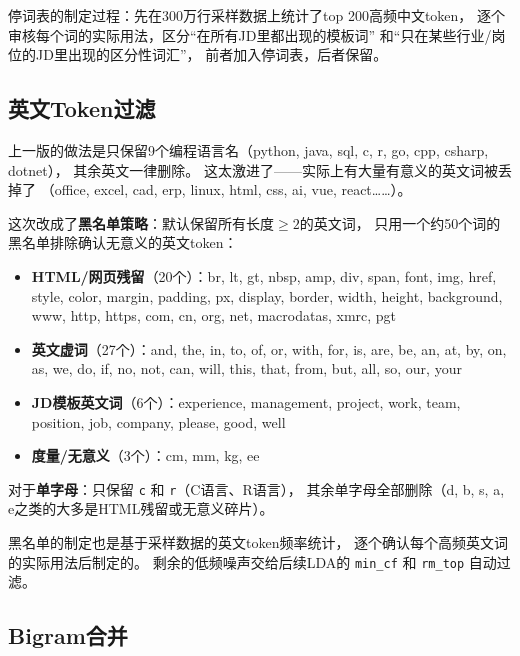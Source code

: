 \documentclass[12pt,a4paper]{ctexart}
\begin{document}
停词表的制定过程：先在300万行采样数据上统计了top 200高频中文token，
逐个审核每个词的实际用法，区分``在所有JD里都出现的模板词''
和``只在某些行业/岗位的JD里出现的区分性词汇''，
前者加入停词表，后者保留。


\subsection{英文Token过滤}

上一版的做法是只保留9个编程语言名（python, java, sql, c, r, go, cpp, csharp, dotnet），
其余英文一律删除。
这太激进了——实际上有大量有意义的英文词被丢掉了
（office, excel, cad, erp, linux, html, css, ai, vue, react……）。

这次改成了\textbf{黑名单策略}：默认保留所有长度$\geq 2$的英文词，
只用一个约50个词的黑名单排除确认无意义的英文token：

\begin{itemize}
\item \textbf{HTML/网页残留}（20个）：br, lt, gt, nbsp, amp, div, span, font, img,
href, style, color, margin, padding, px, display, border, width, height, background,
www, http, https, com, cn, org, net, macrodatas, xmrc, pgt

\item \textbf{英文虚词}（27个）：and, the, in, to, of, or, with, for,
is, are, be, an, at, by, on, as, we, do, if, no, not, can, will,
this, that, from, but, all, so, our, your

\item \textbf{JD模板英文词}（6个）：experience, management, project, work, team,
position, job, company, please, good, well

\item \textbf{度量/无意义}（3个）：cm, mm, kg, ee
\end{itemize}

对于\textbf{单字母}：只保留 \texttt{c} 和 \texttt{r}（C语言、R语言），
其余单字母全部删除（d, b, s, a, e之类的大多是HTML残留或无意义碎片）。

黑名单的制定也是基于采样数据的英文token频率统计，
逐个确认每个高频英文词的实际用法后制定的。
剩余的低频噪声交给后续LDA的 \texttt{min\_cf} 和 \texttt{rm\_top} 自动过滤。


\subsection{Bigram合并}
\end{document}
